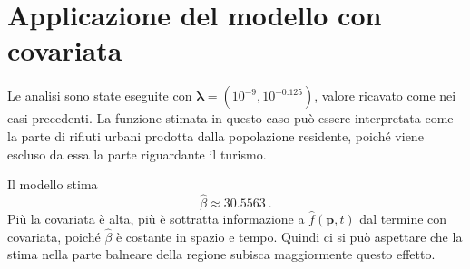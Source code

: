 \documentclass[a4paper,11pt,twoside,openright]{book}							%
\begin{document}
\section{Applicazione del modello con covariata}

Le analisi sono state eseguite con $\bm \lambda = (10^{-9}, 10^{-0.125})$, valore ricavato come nei casi precedenti. La funzione stimata in questo caso può essere interpretata come la parte di rifiuti urbani prodotta dalla popolazione residente, poiché viene escluso da essa la parte riguardante il turismo.

Il modello stima
$$
\hat{\beta}\approx 30.5563 \ .
$$
Più la covariata è alta, più è sottratta informazione a $\hat{f}(\bm p,t)$ dal termine con covariata, poiché $\hat{\beta}$ è costante in spazio e tempo. Quindi ci si può aspettare che la stima nella parte balneare della regione subisca maggiormente questo effetto.
\newpage
\end{document}
